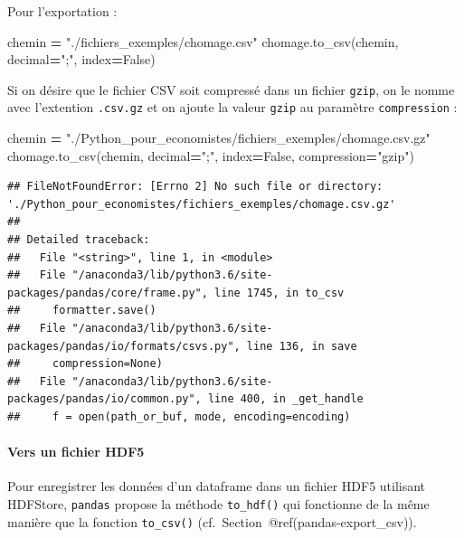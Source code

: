 \documentclass[12pt,]{book}
\newenvironment{Shaded}{\begin{snugshade}}{\end{snugshade}}
\newcommand{\StringTok}[1]{\textcolor[rgb]{0.31,0.60,0.02}{#1}}
\newcommand{\VariableTok}[1]{\textcolor[rgb]{0.00,0.00,0.00}{#1}}
\newcommand{\OperatorTok}[1]{\textcolor[rgb]{0.81,0.36,0.00}{\textbf{#1}}}
\newcommand{\NormalTok}[1]{#1}
\let\oldparagraph\paragraph
\renewcommand{\paragraph}[1]{\oldparagraph{#1}\mbox{}}
\numberwithin{equation}{section}
\numberwithin{countremarque}{section}
\begin{document}
Pour l'exportation :

\begin{Shaded}
\begin{Highlighting}[]
\NormalTok{chemin }\OperatorTok{=} \StringTok{"./fichiers_exemples/chomage.csv"}
\NormalTok{chomage.to_csv(chemin, decimal}\OperatorTok{=}\StringTok{";"}\NormalTok{, index}\OperatorTok{=}\VariableTok{False}\NormalTok{)}
\end{Highlighting}
\end{Shaded}

Si on désire que le fichier CSV soit compressé dans un fichier
\texttt{gzip}, on le nomme avec l'extention \texttt{.csv.gz} et on
ajoute la valeur \texttt{gzip} au paramètre \texttt{compression} :

\begin{Shaded}
\begin{Highlighting}[]
\NormalTok{chemin }\OperatorTok{=} \StringTok{"./Python_pour_economistes/fichiers_exemples/chomage.csv.gz"}
\NormalTok{chomage.to_csv(chemin, decimal}\OperatorTok{=}\StringTok{";"}\NormalTok{, index}\OperatorTok{=}\VariableTok{False}\NormalTok{, compression}\OperatorTok{=}\StringTok{"gzip"}\NormalTok{)}
\end{Highlighting}
\end{Shaded}

\begin{lstlisting}
## FileNotFoundError: [Errno 2] No such file or directory: './Python_pour_economistes/fichiers_exemples/chomage.csv.gz'
## 
## Detailed traceback: 
##   File "<string>", line 1, in <module>
##   File "/anaconda3/lib/python3.6/site-packages/pandas/core/frame.py", line 1745, in to_csv
##     formatter.save()
##   File "/anaconda3/lib/python3.6/site-packages/pandas/io/formats/csvs.py", line 136, in save
##     compression=None)
##   File "/anaconda3/lib/python3.6/site-packages/pandas/io/common.py", line 400, in _get_handle
##     f = open(path_or_buf, mode, encoding=encoding)
\end{lstlisting}

\paragraph{Vers un fichier HDF5}\label{vers-un-fichier-hdf5}

Pour enregistrer les données d'un dataframe dans un fichier HDF5
utilisant HDFStore, \texttt{pandas} propose la méthode
\texttt{to\_hdf()} qui fonctionne de la même manière que la fonction
\texttt{to\_csv()} (cf.~Section~@ref(pandas-export\_csv)).
\end{document}

